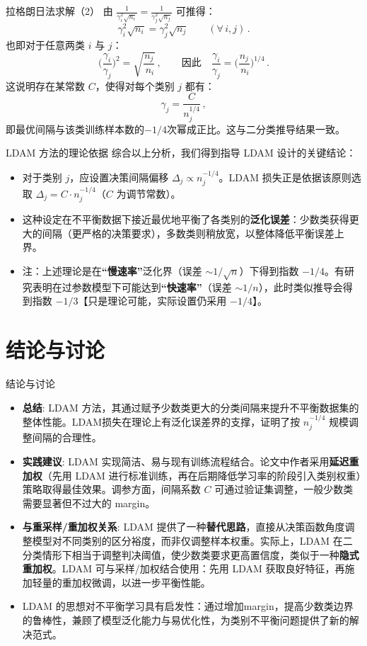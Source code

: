 \documentclass{beamer}
\begin{document}
\begin{frame}{拉格朗日法求解（2）}
    由 $\displaystyle \frac{1}{\gamma_i^2\sqrt{n_i}} = \frac{1}{\gamma_j^2\sqrt{n_j}}$ 可推得：
    \[
        \gamma_i^2 \sqrt{n_i} = \gamma_j^2 \sqrt{n_j} \qquad (\forall\, i,j)\,.
    \]
    也即对于任意两类 $i$ 与 $j$：
    \[
        \Big(\frac{\gamma_i}{\gamma_j}\Big)^2 = \sqrt{\frac{n_j}{\,n_i}}\,, \qquad \text{因此}\quad \frac{\gamma_i}{\gamma_j} = \Big(\frac{n_j}{\,n_i}\Big)^{1/4}\,.
    \]
    这说明存在某常数 $C$，使得对每个类别 $j$ 都有：
    \[
        \gamma_j = \frac{C}{n_j^{1/4}}\,,
    \] 
    即最优间隔与该类训练样本数的$-1/4$次幂成正比。这与二分类推导结果一致。
\end{frame}

\begin{frame}{LDAM 方法的理论依据}
    综合以上分析，我们得到指导 LDAM 设计的关键结论：
    \begin{itemize}
        \item 对于类别 $j$，应设置决策间隔偏移 $\Delta_j \propto n_j^{-1/4}$。LDAM 损失正是依据该原则选取 $\Delta_j = C \cdot n_j^{-1/4}$（$C$ 为调节常数）。
        \item 这种设定在不平衡数据下接近最优地平衡了各类别的\textbf{泛化误差}：少数类获得更大的间隔（更严格的决策要求），多数类则稍放宽，以整体降低平衡误差上界。
        \item 注：上述理论是在\textbf{“慢速率”}泛化界（误差 $\sim 1/\sqrt{n}$）下得到指数 $-1/4$。有研究表明在过参数模型下可能达到\textbf{“快速率”}（误差 $\sim 1/n$），此时类似推导会得到指数 $-1/3$【只是理论可能，实际设置仍采用 $-1/4$】。
    \end{itemize}
\end{frame}

\section{结论与讨论}
\begin{frame}{结论与讨论}
    \begin{itemize}
        \item \textbf{总结}: LDAM 方法，其通过赋予少数类更大的分类间隔来提升不平衡数据集的整体性能。LDAM损失在理论上有泛化误差界的支撑，证明了按 $n_j^{-1/4}$ 规模调整间隔的合理性。
        \item \textbf{实践建议}: LDAM 实现简洁、易与现有训练流程结合。论文中作者采用\textbf{延迟重加权}（先用 LDAM 进行标准训练，再在后期降低学习率的阶段引入类别权重）策略取得最佳效果。调参方面，间隔系数 $C$ 可通过验证集调整，一般少数类需要显著但不过大的 margin。
        \item \textbf{与重采样/重加权关系}: LDAM 提供了一种\textbf{替代思路}，直接从决策函数角度调整模型对不同类别的区分裕度，而非仅调整样本权重。实际上，LDAM 在二分类情形下相当于调整判决阈值，使少数类要求更高置信度，类似于一种\textbf{隐式重加权}。LDAM 可与采样/加权结合使用：先用 LDAM 获取良好特征，再施加轻量的重加权微调，以进一步平衡性能。
        \item LDAM 的思想对不平衡学习具有启发性：通过增加margin，提高少数类边界的鲁棒性，兼顾了模型泛化能力与易优化性，为类别不平衡问题提供了新的解决范式。
    \end{itemize}
\end{frame}
\end{document}
